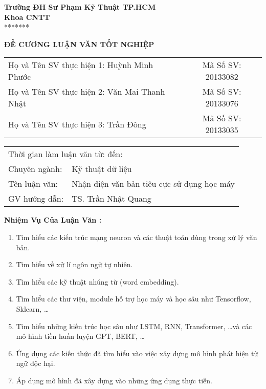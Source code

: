 
\noindent\begin{minipage}[t]{0.43\textwidth}
    \centering
    \fontsize{11pt}{16.5pt}
    \textbf{Trường ĐH Sư Phạm Kỹ Thuật TP.HCM}\\
    \textbf{Khoa CNTT}\\
    *******
\end{minipage}

\begin{center}
    \fontsize{18pt}{27pt}
    \textbf{ĐỀ CƯƠNG LUẬN VĂN TỐT NGHIỆP}
\end{center}

\begin{table}[!h]
    \centering
    \begin{tabularx}{0.8\textwidth}{ X c }
        Họ và Tên SV thực hiện 1: Huỳnh Minh Phước   & Mã Số SV: 20133082 \\
        Họ và Tên SV thực hiện 2: Văn Mai Thanh Nhật & Mã Số SV: 20133076 \\
        Họ và Tên SV thực hiện 3: Trần Đông          & Mã Số SV: 20133035 \\
    \end{tabularx}
\end{table}

\begin{center}
    \begin{tabular}{p{} p{}}
        \multicolumn{2}{l}{Thời gian làm luận văn từ:\hspace{3cm} đến:} \\
        Chuyên ngành: & Kỹ thuật dữ liệu                                \\
        Tên luận văn: & Nhận diện văn bản tiêu cực sử dụng học máy      \\
        GV hướng dẫn: & TS. Trần Nhật Quang
    \end{tabular}
\end{center}

\textbf{Nhiệm Vụ Của Luận Văn :}
\begin{enumerate}
    \item Tìm hiểu các kiến trúc mạng neuron và các thuật toán dùng trong xử lý văn bản.
    \item Tìm hiểu về xử lí ngôn ngữ tự nhiên.
    \item Tìm hiểu các kỹ thuật nhúng từ (word embedding).
    \item Tìm hiểu các thư viện, module hỗ trợ học máy và học sâu như Tensorflow, Sklearn, \dots
    \item Tìm hiểu những kiến trúc học sâu như LSTM, RNN, Transformer, \dots và các mô hình tiền huấn luyện GPT, BERT, \dots
    \item Ứng dụng các kiến thức đã tìm hiểu vào việc xây dựng mô hình phát hiện từ ngữ độc hại.
    \item Áp dụng mô hình đã xây dựng vào những ứng dụng thực tiễn.
\end{enumerate}

